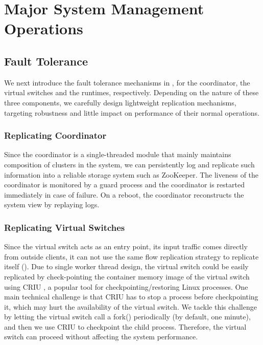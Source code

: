 \section{Major System Management Operations}
\label{sec:management}

\subsection{Fault Tolerance}
\label{sec:resilience}

We next introduce the fault tolerance mechanisms in \nfactor, for the coordinator, the virtual switches and the runtimes, respectively.
Depending on the nature of these three components, we carefully design
lightweight replication mechanisms, targeting robustness and little impact on performance of their normal operations.

\subsubsection{Replicating Coordinator}

Since the coordinator is a single-threaded module that mainly maintains composition of clusters in the system, we can persistently log and replicate such information into a reliable storage system such as ZooKeeper\cite{hunt2010zookeeper}. %
The liveness of the coordinator is monitored by a guard process and the
coordinator is restarted immediately in case of failure. On a reboot, the coordinator reconstructs the system view by replaying logs.

\subsubsection{Replicating Virtual Switches}


Since the virtual switch acts as an entry point, \ie its input traffic comes directly from outside clients, it can not use the same flow replication strategy to replicate itself (\label{sec:replicating-runtime}). Due to single worker thread design, the virtual switch could be easily replicated by
check-pointing the container memory image of the virtual switch using CRIU
\cite{criu}, a popular tool for checkpointing/restoring Linux processes. One main technical challenge is that CRIU has to stop a process before checkpointing it, which may hurt the availability of the virtual switch. We tackle this challenge by letting the virtual switch call a fork() periodically (by default, one minute), and then we use CRIU to checkpoint
the child process. Therefore, the virtual switch can proceed without affecting
the system performance.

